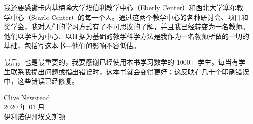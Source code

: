 我还要感谢卡内基梅隆大学埃伯利教学中心（Eberly Center）和西北大学塞尔教学中心（Searle Center）的每一个人。通过这两个教学中心的各种研讨会、项目和奖学金，我对人们的学习方式有了不可思议的了解，并且我已经转变为一名教师。他们以学生为中心、以证据为基础的教学科学方法是我作为一名教师所做的一切的基础，包括写这本书---他们的影响不容低估。

最后，也是最重要的，我要感谢已经使用本书学习数学的 1000+ 学生。每当有学生联系我提出问题或指出错误时，这本书就会变得更好；这反映在几十个印刷错误中，这些错误已经修复。

\begin{flushright}
Clive Newstead\\
2020 年 01 月\\
伊利诺伊州埃文斯顿
\end{flushright}